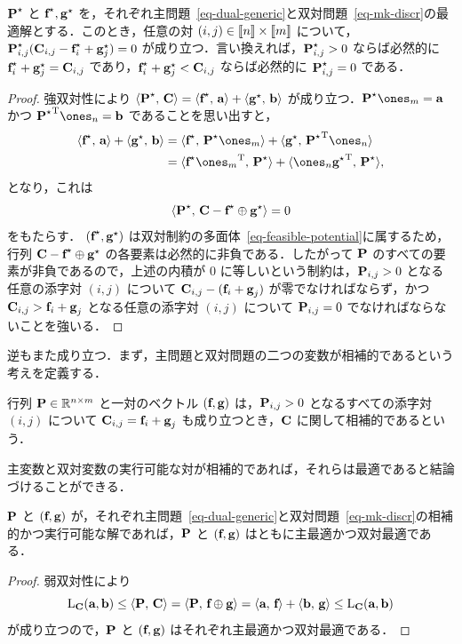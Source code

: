 \begin{prop}\label{prop-primal-dual-optimal}$\P^\star$ と $\fD^\star,\gD^\star$ を，それぞれ主問題~\eqref{eq-dual-generic}と双対問題~\eqref{eq-mk-discr}の最適解とする．このとき，任意の対 $(i,j)\in\range{n}\times\range{m}$ について，$\P^\star_{i,j}(\C_{i,j}-\fD^\star_i+\gD^\star_j)=0$ が成り立つ．言い換えれば，$\P^\star_{i,j}>0$ ならば必然的に $\fD^\star_i+\gD^\star_j=\C_{i,j}$ であり，$\fD^\star_i+\gD^\star_j<\C_{i,j}$ ならば必然的に $\P^\star_{i,j}=0$ である．
\end{prop}
\begin{proof} 強双対性により $\dotp{\P^\star}{\C} = \dotp{\fD^\star}{\a}+\dotp{\gD^\star}{\b}$ が成り立つ．$\P^\star\ones_m = \a$ かつ $\transp{\P^\star}\ones_n = \b$ であることを思い出すと，
	$$\begin{aligned}\dotp{\fD^\star}{\a}+\dotp{\gD^\star}{\b} &= \dotp{\fD^\star}{\P^\star\ones_m}+\dotp{\gD^\star}{\transp{\P^\star}\ones_n}\\&=  \dotp{\fD^\star\transp{\ones_m}}{\P^\star}+\dotp{\ones_n\transp{\gD^\star}}{\P^\star},\end{aligned}$$
	となり，これは $$\dotp{\P^\star}{\C- \fD^\star\oplus \gD^\star}=0$$ をもたらす．
$(\fD^\star,\gD^\star)$ は双対制約の多面体~\eqref{eq-feasible-potential}に属するため，行列 $\C- \fD^\star\oplus \gD^\star$ の各要素は必然的に非負である．したがって $\P$ のすべての要素が非負であるので，上述の内積が $0$ に等しいという制約は，$\P_{i,j}>0$ となる任意の添字対 $(i,j)$ について $\C_{i,j}-(\fD_i+\gD_j)$ が零でなければならず，かつ $\C_{i,j}>\fD_i+\gD_j$ となる任意の添字対 $(i,j)$ について $\P_{i,j}=0$ でなければならないことを強いる．
\end{proof}

逆もまた成り立つ．まず，主問題と双対問題の二つの変数が相補的であるという考えを定義する．

\begin{defn}\label{def-complementary}
行列 $\P\in\RR^{n\times m}$ と一対のベクトル $(\fD,\gD)$ は，$\P_{i,j}>0$ となるすべての添字対 $(i,j)$ について $\C_{i,j}=\fD_i+\gD_j$ も成り立つとき，$\C$ に関して相補的であるという．
\end{defn}

主変数と双対変数の実行可能な対が相補的であれば，それらは最適であると結論づけることができる．

\begin{prop}\label{prop-primal-dual-optimality} $\P$ と $(\fD,\gD)$ が，それぞれ主問題~\eqref{eq-dual-generic}と双対問題~\eqref{eq-mk-discr}の相補的かつ実行可能な解であれば，$\P$ と $(\fD,\gD)$ はともに主最適かつ双対最適である．
\end{prop}
\begin{proof}
	弱双対性により
$$\MKD_{\C}(\a,\b)\leq \dotp{\P}{\C}=\dotp{\P}{\fD\oplus\gD}=\dotp{\a}{\fD}+\dotp{\b}{\gD}\leq \MKD_{\C}(\a,\b)$$
が成り立つので，$\P$ と $(\fD,\gD)$ はそれぞれ主最適かつ双対最適である．
\end{proof}


